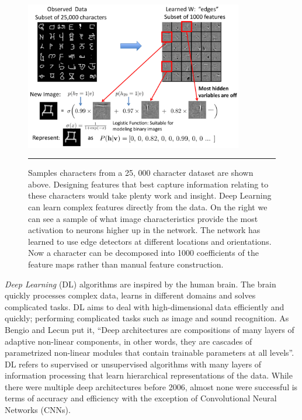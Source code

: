 \begin{figure}[htbp]
	\centering
		\includegraphics[width = 0.85\textwidth]{./Figures/Deep_Learning_Russ_Salakhutdinov_first_layer_features.jpg} %
		\rule{35em}{0.5pt}
	\caption[Learned Features]{Samples characters from a 25, 000 character dataset are shown above\citep{salakhutdinov2009deep}. Designing features that best capture information relating to these characters would take plenty work and insight. Deep Learning can learn complex features directly from the data. On the right we can see a sample of what image characteristics provide the most activation to neurons higher up in the network. The network has learned to use edge detectors at different locations and orientations. Now a character can be decomposed into 1000 coefficients of the feature maps rather than manual feature construction.}
	\label{fig:first_layer_features}
\end{figure}

\textit{Deep Learning} (DL) algorithms are inspired by the human brain\citep{mo2012survey}\citep{chen2014big}.
The brain quickly processes complex data, learns in different domains and solves complicated tasks.
DL aims to deal with high-dimensional data efficiently and quickly; performing complicated tasks such as image and sound recognition.
As Bengio and Lecun put it, ``Deep architectures are compositions of many layers of adaptive non-linear components, in other words, they are cascades of parametrized non-linear modules that contain trainable parameters at all levels''\citep{bengio2007scaling}.
DL refers to supervised or unsupervised algorithms with many layers of information processing that learn hierarchical representations of the data\citep{chen2014big}\citep{dengthree}.
While there were multiple deep architectures before 2006, almost none were successful is terms of accuracy and efficiency with the exception of Convolutional Neural Networks (CNNs)\citep{lecun1995convolutional}. 

